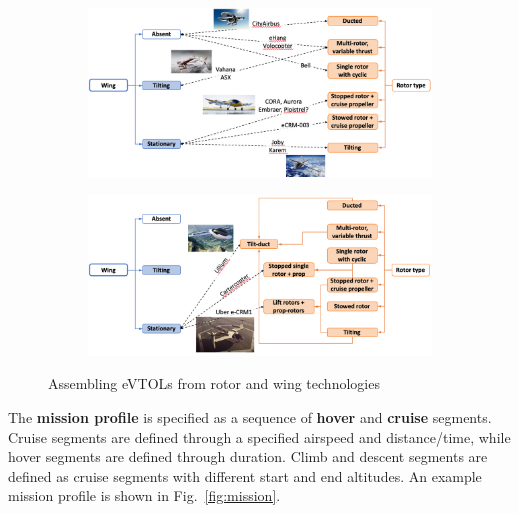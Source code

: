 \begin{figure}
     \centering
     \begin{subfigure}
         \centering
         \includegraphics[width=\textwidth]{images/evtols1.png}
         \label{fig:evtols1}
     \end{subfigure}
     \hfill
     \begin{subfigure}
         \centering
         \includegraphics[width=\textwidth]{images/evtols2.png}
         \label{fig:evtols2}
     \end{subfigure}
        \caption{Assembling eVTOLs from rotor and wing technologies}
        \label{fig:evtol_types}
\end{figure}

The \textbf{mission profile} is specified as a sequence of \textbf{hover} and \textbf{cruise} segments. Cruise segments are defined through a specified airspeed and distance/time, while hover segments are defined through duration. Climb and descent segments are defined as cruise segments with different start and end altitudes. An example mission profile is shown in Fig.~\ref{fig:mission}. 

